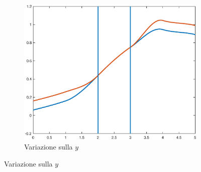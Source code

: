 \documentclass[a4paper, 12pt]{article}
\begin{document}
\begin{figure}[]
\begin{subfigure}[b]{0.3\textwidth}
      \includegraphics[width=\textwidth]{figure/loc4.eps}
      \caption{Variazione sulla $y$}
      \label{fig:loc4}
  \end{subfigure}
  \label{fig:loc_spline}
\end{figure} 
\end{document}
